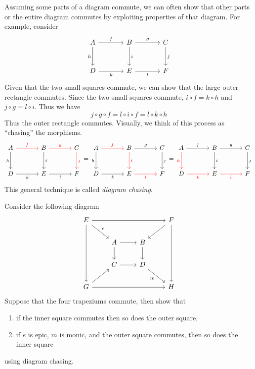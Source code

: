 \documentclass[11pt]{book}
\begin{document}
\begin{example}Assuming some parts of a diagram commute, we can often show that other parts or the entire diagram commutes by exploiting properties of that diagram. For example, consider
\[
\begin{tikzcd}[sep = large]
A \arrow[d, "h"'] \arrow[r, "f"] & B \arrow[d, "i"] \arrow[r, "g"] & C \arrow[d, "j"] \\
D \arrow[r, "k"']                & E \arrow[r, "l"']               & F               
\end{tikzcd}
\]
Given that the two small squares commute, we can show that the large outer rectangle commutes. Since the two small squares commute, $i\circ f=k\circ h$ and $j\circ g=l\circ i$. Thus we have
\[j\circ g\circ f=l\circ i\circ f=l\circ k\circ h\]
Thus the outer rectangle commutes. Visually, we think of this process as ``chasing'' the morphisms.
\[
\begin{tikzcd}[sep = large]
A \arrow[d, "h"'] \arrow[r, "f", color=red] & B \arrow[d, "i"] \arrow[r, "g", color=red] & C \arrow[d, "j", color=red] \\
D \arrow[r, "k"']                & E \arrow[r, "l"']               & F 
\end{tikzcd}=
\begin{tikzcd}[sep = large]
A \arrow[d, "h"'] \arrow[r, "f", color=red] & B \arrow[d, "i",color=red] \arrow[r, "g"] & C \arrow[d, "j"] \\
D \arrow[r, "k"']                & E \arrow[r, "l"',color=red]               & F 
\end{tikzcd}=
\begin{tikzcd}[sep = large]
A \arrow[d, "h"', color=red] \arrow[r, "f"] & B \arrow[d, "i"] \arrow[r, "g"] & C \arrow[d, "j"] \\
D \arrow[r, "k"',color=red]                & E \arrow[r, "l"',color=red]               & F 
\end{tikzcd}
\]
This general technique is called \textit{diagram chasing}.
\end{example}
\begin{exercise}Consider the following diagram
\[\begin{tikzcd}
E \arrow[rrr] \arrow[ddd] \arrow[rd, "e"] &                       &                    & F \arrow[ddd] \arrow[ld] \\
                                          & A \arrow[r] \arrow[d] & B \arrow[d]        &                          \\
                                          & C \arrow[r]           & D \arrow[rd, "m"'] &                          \\
G \arrow[rrr] \arrow[ru]                  &                       &                    & H                       
\end{tikzcd}\]
Suppose that the four trapeziums commute, then show that
\begin{enumerate}[label=(\alph*)]
	\item if the inner square commutes then so does the outer square,
	\item if $e$ is epic, $m$ is monic, and the outer square commutes, then so does the inner square
\end{enumerate}
using diagram chasing.
\end{exercise}
\end{document}
